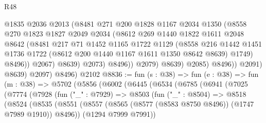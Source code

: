 \begin{lexlean}{R48}
\begin{coremodule}
                            @1835
                            @2036
                            @2013
                            (@8481
                              @271
                              @200
                              @1828
                              @1167
                              @2034
                              @1350
                              (@8558
                                @270
                                @1823
                                @1827
                                @2049
                                @2034
                                (@8612
                                  @269
                                  @1440
                                  @1822
                                  @1611
                                  @2048
                                  @8642
                                  (@8481
                                    @217
                                    @71
                                    @1452
                                    @1165
                                    @1722
                                    @1129
                                    (@8558
                                      @216
                                      @1442
                                      @1451
                                      @1736
                                      @1722
                                      (@8612 @200 @1440 @1167 @1611 @1350 @8642 @8639)
                                      @1749)
                                    @8496))
                                @2067)
                              @8639)
                            @2073)
                          @8496))
                      @2079)
                    @8639)
                  @2085)
                @8496))
            @2091)
          @8639)
        @2097)
      @8496)
    @2102
@8836 := fun (s : @38) =>
  fun (e : @38) =>
  fun (m : @38) =>
  @5702
    (@5856
      (@6002
        (@6445
          (@6534
            (@6785
              (@6941
                (@7025
                  (@7774
                    (@7928
                      (fun ("_" : @7929) =>
                      @8503
                        (fun ("_" : @8504) =>
                        @8518
                          (@8524
                            (@8535
                              (@8551
                                (@8557
                                  (@8565 (@8577 (@8583 @8750 @8496)) (@1747 @7989 @1910))
                                  @8496))
                              (@1294 @7999 @7991))

\end{coremodule}
\end{lexlean}
